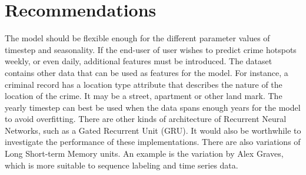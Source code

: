 \section{Recommendations}
    The model should be flexible enough for the different parameter values of timestep and seasonality. If the end-user of user wishes to predict crime hotspots weekly, or even daily, additional features must be introduced. The dataset contains other data that can be used as features for the model. For instance, a criminal record has a location type attribute that describes the nature of the location of the crime. It may be a street, apartment or other land mark. The yearly timestep can best be used when the data spans enough years for the model to avoid overfitting.
    There are other kinds of architecture of Recurrent Neural Networks, such as a Gated Recurrent Unit (GRU). It would also be worthwhile to investigate the performance of these implementations.
    There are also variations of Long Short-term Memory units. An example is the variation by Alex Graves, which is more suitable to sequence labeling and time series data.